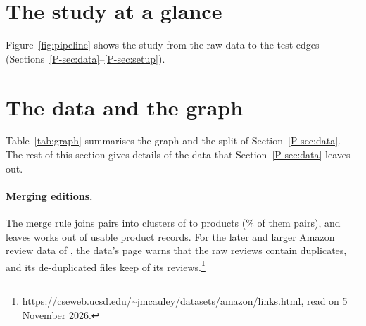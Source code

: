 \section{The study at a glance}
\label{app:overview}

Figure~\ref{fig:pipeline} shows the study from the raw data to the test edges
(Sections~\ref*{P-sec:data}--\ref*{P-sec:setup}).



\section{The data and the graph}
\label{app:graph}

Table~\ref{tab:graph} summarises the graph and the split of Section~\ref*{P-sec:data}. The rest of
this section gives details of the data that Section~\ref*{P-sec:data} leaves out.

\paragraph{Merging editions.} The merge rule joins  pairs into
 clusters of  to  products
(\% of them pairs), and leaves  works out of
 usable product records. For the later and larger Amazon review data of
\citet{mcauley2015image}, the data's page warns that the raw reviews contain duplicates, and its
de-duplicated files keep  of its 
reviews.\footnote{\url{https://cseweb.ucsd.edu/~jmcauley/datasets/amazon/links.html}, read on
5 November 2026.}

